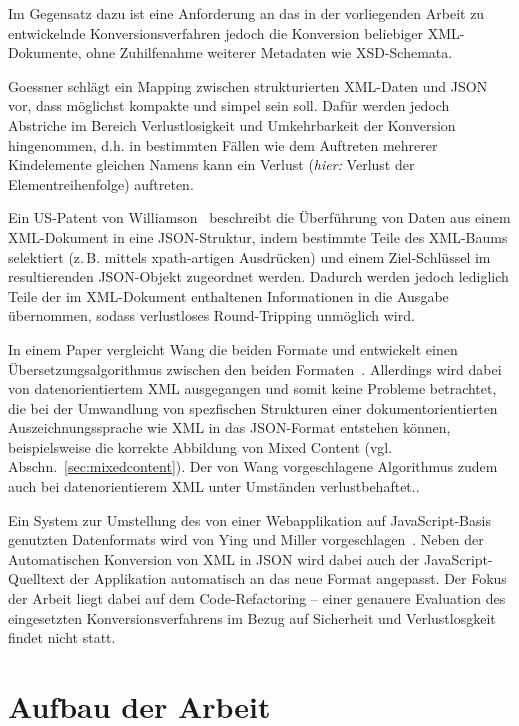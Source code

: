 Im Gegensatz dazu ist eine Anforderung an das in der vorliegenden Arbeit zu entwickelnde Konversionsverfahren jedoch die Konversion beliebiger XML-Dokumente, ohne Zuhilfenahme weiterer Metadaten wie XSD-Schemata.

Goessner schlägt ein Mapping zwischen strukturierten XML-Daten und JSON vor, dass möglichst kompakte und simpel sein soll. Dafür werden jedoch Abstriche im Bereich Verlustlosigkeit und Umkehrbarkeit der Konversion hingenommen, d.h. in bestimmten Fällen wie dem Auftreten mehrerer Kindelemente gleichen Namens kann ein Verlust (\emph{hier:} Verlust der Elementreihenfolge) auftreten.~\cite{goessner2006converting}

Ein US-Patent von Williamson~\cite{US20140244692} beschreibt die Überführung von Daten aus einem XML-Dokument in eine JSON-Struktur, indem bestimmte Teile des XML-Baums selektiert (z.\,B. mittels \acrshort{xpath}-artigen Ausdrücken) und einem Ziel-Schlüssel im resultierenden JSON-Objekt zugeordnet werden. Dadurch werden jedoch lediglich Teile der im XML-Dokument enthaltenen Informationen in die Ausgabe übernommen, sodass verlustloses Round-Tripping unmöglich wird.

In einem Paper vergleicht Wang die beiden Formate und entwickelt einen Übersetzungsalgorithmus zwischen den beiden Formaten~\cite{wang2011improving}. Allerdings wird dabei von datenorientiertem XML ausgegangen und somit keine Probleme betrachtet, die bei der Umwandlung von spezfischen Strukturen einer dokumentorientierten Auszeichnungssprache wie XML in das JSON-Format entstehen können, beispielsweise die korrekte Abbildung von Mixed Content (vgl. Abschn.~\ref{sec:mixedcontent}). Der von Wang vorgeschlagene Algorithmus zudem auch bei datenorientierem XML unter Umständen verlustbehaftet.\cite[S.~184]{wang2011improving}.

Ein System zur Umstellung des von einer Webapplikation auf JavaScript-Basis genutzten Datenformats wird von Ying und Miller vorgeschlagen~\cite{ying2013refactoring}. Neben der Automatischen Konversion von XML in JSON wird dabei auch der JavaScript-Quelltext der Applikation automatisch an das neue Format angepasst. Der Fokus der Arbeit liegt dabei auf dem Code-Refactoring -- einer genauere Evaluation des eingesetzten Konversionsverfahrens im Bezug auf Sicherheit und Verlustlosgkeit findet nicht statt.

\section{Aufbau der Arbeit}
\label{sec:structure}

